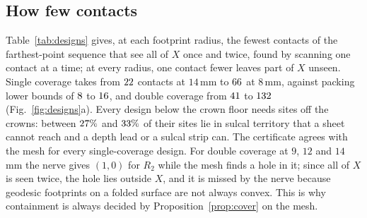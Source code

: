 \documentclass[11pt]{amsart}
\theoremstyle{definition}
\theoremstyle{remark}
\begin{document}
\subsection*{How few contacts}
Table~\ref{tab:designs} gives, at each footprint radius, the fewest contacts of
the farthest-point sequence that see all of $X$ once and twice, found by
scanning one contact at a time; at every radius, one contact fewer leaves part
of $X$ unseen. Single coverage takes from $22$ contacts at
$14$\,mm to $66$ at $8$\,mm, against packing lower bounds of
$8$ to $16$, and double coverage from $41$ to
$132$ (Fig.~\ref{fig:designs}a). Every design below the crown floor
needs sites off the crowns: between $27\%$ and $33\%$ of
their sites lie in sulcal territory that a sheet cannot reach and a depth lead
or a sulcal strip can. The certificate agrees with the mesh for every
single-coverage design. For double coverage at $9$, $12$ and $14$\,mm the nerve
gives $(1,0)$ for $R_2$ while the mesh finds a hole in it; since all of $X$ is
seen twice, the hole lies outside $X$, and it is missed by the nerve because
geodesic footprints on a folded surface are not always convex. This is why
containment is always decided by Proposition~\ref{prop:cover} on the mesh.
\end{document}
